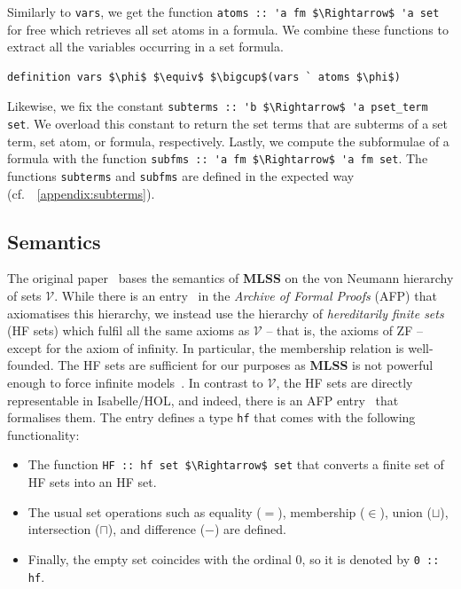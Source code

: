 \documentclass[runningheads]{llncs}
\newcommand{\MLSS}{\textbf{MLSS}}
\newcommand{\hfmem}{\boldsymbol{\in}}
\begin{document}
Similarly to \lstinline!vars!, we get the function \lstinline!atoms :: 'a fm $\Rightarrow$ 'a set! for free which retrieves all set atoms in a formula.
We combine these functions to extract all the variables occurring in a set formula.
\begin{lstlisting}
definition vars $\phi$ $\equiv$ $\bigcup$(vars ` atoms $\phi$)
\end{lstlisting}

Likewise, we fix the constant \lstinline!subterms :: 'b $\Rightarrow$ 'a pset_term set!.
We overload this constant to return the set terms that are subterms of a set term, set atom, or formula, respectively. Lastly, we compute the subformulae of a formula with the function \lstinline!subfms :: 'a fm $\Rightarrow$ 'a fm set!.
The functions \lstinline!subterms! and \lstinline!subfms! are defined in the expected way (cf.\ \appendixname~\ref{appendix:subterms}).

\subsection{Semantics}
The original paper~\cite{new_fast_tableau} bases the semantics of \MLSS{} on the von Neumann hierarchy of sets $\mathcal{V}$. 
While there is an entry~\cite{zfc_in_hol_afp} in the \emph{Archive of Formal Proofs} (AFP) that axiomatises this hierarchy,
we instead use the hierarchy of \emph{hereditarily finite sets} (HF sets) which fulfil all the same axioms as $\mathcal{V}$ -- that is, the axioms of ZF -- except for the axiom of infinity.
In particular, the membership relation is well-founded.
The HF sets are sufficient for our purposes as \MLSS{} is not powerful enough to force infinite models~\cite[Chapter~14.2]{set_theory}.
In contrast to $\mathcal{V}$, the HF sets are directly representable in Isabelle/HOL, and indeed, there is an AFP entry~\cite{hf_AFP} that formalises them.
The entry defines a type \lstinline!hf! that comes with the following functionality:
\begin{itemize}
  \item The function \lstinline!HF :: hf set $\Rightarrow$ set! that converts a finite set of HF sets into an HF set.
\item The usual set operations such as equality ($=$), membership ($\hfmem$), union ($\sqcup$), intersection ($\sqcap$), and difference ($-$) are defined.
\item Finally, the empty set coincides with the ordinal $0$, so it is denoted by \lstinline!0 :: hf!.
\end{itemize}
\end{document}
